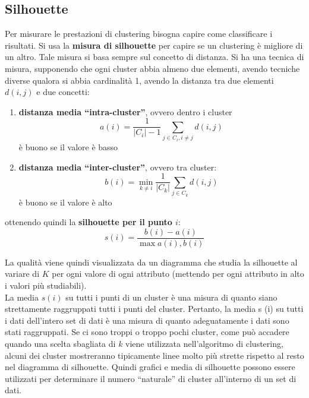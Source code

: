 \subsection{Silhouette}
Per misurare le prestazioni di clustering bisogna capire come classificare i
risultati. Si usa la \textbf{misura di silhouette} per capire se un clustering è
migliore di un altro. Tale misura si basa sempre sul concetto di distanza. Si
ha una tecnica di misura, supponendo che ogni cluster abbia almeno due
elementi, avendo tecniche diverse qualora si abbia cardinalità 1, avendo la
distanza tra due elementi $d(i, j)$ e due concetti:
\begin{enumerate}
  \item \textbf{distanza media ``intra-cluster''}, ovvero dentro i cluster
  \[a(i)=\frac{1}{|C_i|-1}\sum_{j\in C_i, i\neq j}d(i, j)\]
  è buono se il valore è basso
  \item \textbf{distanza media ``inter-cluster''}, ovvero tra cluster:
  \[b(i)=\min_{k\neq i}\frac{1}{|C_k|}\sum_{j\in C_k}d(i, j)\]
  è buono se il valore è alto
\end{enumerate}
ottenendo quindi la \textbf{silhouette per il punto $i$}:
\[s(i)=\frac{b(i)-a(i)}{\max{a(i), b(i)}}\]

La qualità viene quindi visualizzata da un diagramma che studia la silhouette al
variare di $K$ per ogni valore di ogni attributo (mettendo per ogni attributo in
alto i valori più studiabili).\\
La media $s(i)$ su tutti i punti di un cluster è una misura di quanto siano
strettamente raggruppati tutti i punti del cluster. Pertanto, la media s (i) su
tutti i dati dell'intero set di dati è una misura di quanto adeguatamente i dati
sono stati raggruppati. Se ci sono troppi o troppo pochi cluster, come può
accadere quando una scelta sbagliata di $k$ viene utilizzata nell'algoritmo di
clustering, alcuni dei cluster mostreranno tipicamente
linee molto più strette rispetto al resto nel diagramma di silhouette. Quindi
grafici e media di silhouette 
possono essere utilizzati per determinare il numero ``naturale'' di cluster
all'interno di un set di dati. 
